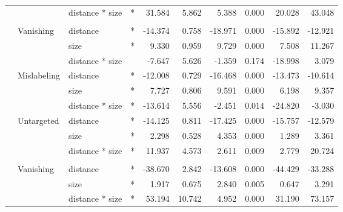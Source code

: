 \documentclass[
]{article}
\begin{document}
\begin{longtable}[t]{llllrrrrrr}
\cmidrule{3-10}\nopagebreak
\hspace{1em} &  & distance * size & * & 31.584 & 5.862 & 5.388 & 0.000 & 20.028 & 43.048\\
\cmidrule{1-10}\pagebreak[0]
\addlinespace[0.3em]
\multicolumn{10}{l}{\textbf{SSD}}\\
\hspace{1em} & Vanishing & distance & * & -14.374 & 0.758 & -18.971 & 0.000 & -15.892 & -12.921\\
\cmidrule{3-10}\nopagebreak
\hspace{1em} &  & size & * & 9.330 & 0.959 & 9.729 & 0.000 & 7.508 & 11.267\\
\cmidrule{3-10}\nopagebreak
\hspace{1em} &  & distance * size &  & -7.647 & 5.626 & -1.359 & 0.174 & -18.998 & 3.079\\
\cmidrule{2-10}\nopagebreak
\hspace{1em} & Mislabeling & distance & * & -12.008 & 0.729 & -16.468 & 0.000 & -13.473 & -10.614\\
\cmidrule{3-10}\nopagebreak
\hspace{1em} &  & size & * & 7.727 & 0.806 & 9.591 & 0.000 & 6.198 & 9.357\\
\cmidrule{3-10}\nopagebreak
\hspace{1em} &  & distance * size & * & -13.614 & 5.556 & -2.451 & 0.014 & -24.820 & -3.030\\
\cmidrule{2-10}\nopagebreak
\hspace{1em} & Untargeted & distance & * & -14.125 & 0.811 & -17.425 & 0.000 & -15.757 & -12.579\\
\cmidrule{3-10}\nopagebreak
\hspace{1em} &  & size & * & 2.298 & 0.528 & 4.353 & 0.000 & 1.289 & 3.361\\
\cmidrule{3-10}\nopagebreak
\hspace{1em} &  & distance * size & * & 11.937 & 4.573 & 2.611 & 0.009 & 2.779 & 20.724\\
\cmidrule{1-10}\pagebreak[0]
\addlinespace[0.3em]
\multicolumn{10}{l}{\textbf{RetinaNet}}\\
\hspace{1em} & Vanishing & distance & * & -38.670 & 2.842 & -13.608 & 0.000 & -44.429 & -33.288\\
\cmidrule{3-10}\nopagebreak
\hspace{1em} &  & size & * & 1.917 & 0.675 & 2.840 & 0.005 & 0.647 & 3.291\\
\cmidrule{3-10}\nopagebreak
\hspace{1em} &  & distance * size & * & 53.194 & 10.742 & 4.952 & 0.000 & 31.190 & 73.157\\

\end{longtable}
\end{document}
